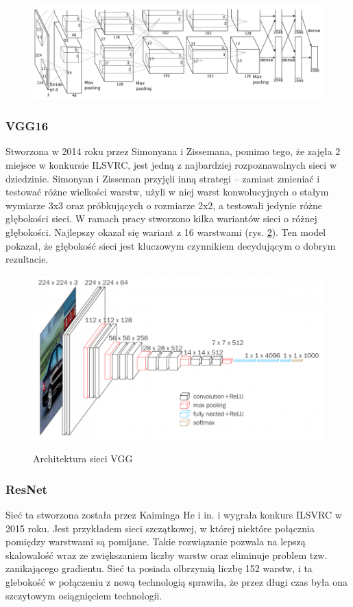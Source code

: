 \documentclass[a4paper,twoside,12pt]{book}
\begin{document}
{\begin{figure}[h]
\centering
\includegraphics[scale=0.24]{alex.png}
\label{AlexNet}
\end{figure}

\subsubsection{VGG16\cite{simonyan2014very}}
\label{vg}
{Stworzona w 2014 roku przez Simonyana i Zissemana, pomimo tego, że zajęła 2 miejsce w konkursie ILSVRC, jest jedną z najbardziej rozpoznawalnych sieci w dziedzinie. Simonyan i Zisseman przyjęli inną strategi – zamiast zmieniać i testować różne wielkości warstw, użyli w niej warst konwolucyjnych o stałym wymiarze 3x3 oraz próbkujących o rozmiarze 2x2, a testowali jedynie różne głębokości sieci. W ramach pracy stworzono kilka wariantów sieci o różnej głębokości. Najlepszy okazał się wariant z 16 warstwami (rys. \ref{VGG}). Ten model pokazał, że głębokość sieci jest kluczowym czynnikiem decydującym o dobrym rezultacie.}
\begin{figure}[h!]
\caption{Architektura sieci VGG}

\centering
\includegraphics[scale=0.4]{VGG.png}
\label{VGG}
\end{figure}







\subsubsection{ResNet\cite{he2016deep}}
\label{Res}
{Sieć ta stworzona została przez Kaiminga He i in. i wygrała konkurs ILSVRC w 2015 roku. Jest przykładem sieci szczątkowej, w której niektóre połącznia pomiędzy warstwami są pomijane. Takie rozwiązanie pozwala na lepszą skalowalość wraz ze zwiększaniem liczby warstw oraz eliminuje problem tzw. zanikającego gradientu. Sieć ta posiada olbrzymią liczbę 152 warstw, i ta glebokość w połączeniu z nową technologią sprawiła, że przez długi czas była ona szczytowym osiągnięciem technologii.}

}
\end{document}
